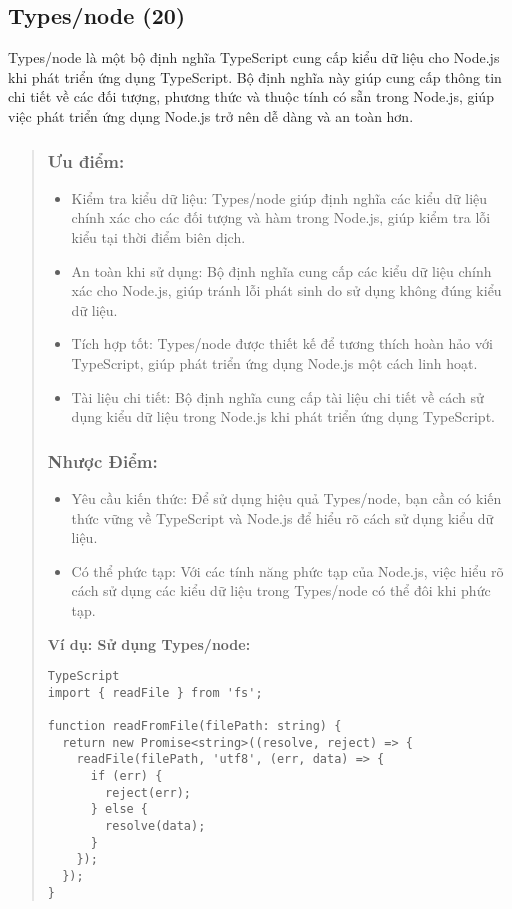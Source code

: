 \subsection{Types/node (20)}

Types/node là một bộ định nghĩa TypeScript cung cấp kiểu dữ liệu cho Node.js khi phát triển ứng dụng TypeScript. Bộ định nghĩa này giúp cung cấp thông tin chi tiết về các đối tượng, phương thức và thuộc tính có sẵn trong Node.js, giúp việc phát triển ứng dụng Node.js trở nên dễ dàng và an toàn hơn.

\begin{quote}
\subsubsection{Ưu điểm:}
\begin{itemize}
  \item Kiểm tra kiểu dữ liệu: Types/node giúp định nghĩa các kiểu dữ liệu chính xác cho các đối tượng và hàm trong Node.js, giúp kiểm tra lỗi kiểu tại thời điểm biên dịch.
  \item An toàn khi sử dụng: Bộ định nghĩa cung cấp các kiểu dữ liệu chính xác cho Node.js, giúp tránh lỗi phát sinh do sử dụng không đúng kiểu dữ liệu.
  \item Tích hợp tốt: Types/node được thiết kế để tương thích hoàn hảo với TypeScript, giúp phát triển ứng dụng Node.js một cách linh hoạt.
  \item Tài liệu chi tiết: Bộ định nghĩa cung cấp tài liệu chi tiết về cách sử dụng kiểu dữ liệu trong Node.js khi phát triển ứng dụng TypeScript.
\end{itemize}

\subsubsection{Nhược Điểm:}
\begin{itemize}
  \item Yêu cầu kiến thức: Để sử dụng hiệu quả Types/node, bạn cần có kiến thức vững về TypeScript và Node.js để hiểu rõ cách sử dụng kiểu dữ liệu.
  \item Có thể phức tạp: Với các tính năng phức tạp của Node.js, việc hiểu rõ cách sử dụng các kiểu dữ liệu trong Types/node có thể đôi khi phức tạp.
\end{itemize}

\textbf{Ví dụ: Sử dụng Types/node:}
\begin{lstlisting}
TypeScript
import { readFile } from 'fs';

function readFromFile(filePath: string) {
  return new Promise<string>((resolve, reject) => {
    readFile(filePath, 'utf8', (err, data) => {
      if (err) {
        reject(err);
      } else {
        resolve(data);
      }
    });
  });
}
\end{lstlisting}
\end{quote}


